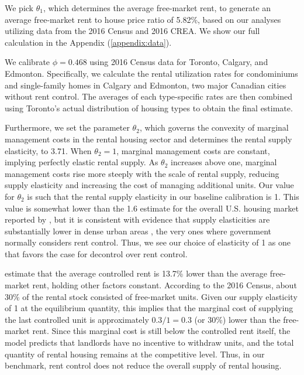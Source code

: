 \documentclass[parskip=full]{article}
\begin{document}
We pick $\theta_1$, which determines the average free-market rent, to generate an average free-market rent to house price ratio of 5.82\%, based on our analyses utilizing data from the 2016 Census and 2016 CREA. We show our full calculation in the Appendix (\ref{appendix:data}).

We calibrate $\phi=0.468$ using 2016 Census data for Toronto, Calgary, and Edmonton. Specifically, we calculate the rental utilization rates for condominiums and single-family homes in Calgary and Edmonton, two major Canadian cities without rent control. The averages of each type-specific rates are then combined using Toronto’s actual distribution of housing types to obtain the final estimate. 

Furthermore, we set the parameter $\theta_2$, which governs the convexity of marginal management costs in the rental housing sector and determines the rental supply elasticity, to 3.71. When $\theta_2=1$, marginal management costs are constant, implying perfectly elastic rental supply. As $\theta_2$ increases above one, marginal management costs rise more steeply with the scale of rental supply, reducing supply elasticity and increasing the cost of managing additional units. Our value for $\theta_2$ is such that the rental supply elasticity in our baseline calibration is 1. This value is somewhat lower than the 1.6 estimate for the overall U.S. housing market reported by \citet{rs-2023}, but it is consistent with evidence that supply elasticities are substantially lower in dense urban areas \citep{cy-1994,susin-2002,fack-2006,sy-2020}, the very ones where government normally considers rent control. Thus, we see our choice of elasticity of 1 as one that favors the case for decontrol over rent control.

\citet{zhang-gou} estimate that the average controlled rent is 13.7\% lower than the average free-market rent, holding other factors constant. According to the 2016 Census, about 30\% of the rental stock consisted of free-market units. Given our supply elasticity of 1 at the equilibrium quantity, this implies that the marginal cost of supplying the last controlled unit is approximately $0.3/1=0.3$ (or 30\%) lower than the free-market rent. Since this marginal cost is still below the controlled rent itself, the model predicts that landlords have no incentive to withdraw units, and the total quantity of rental housing remains at the competitive level. Thus, in our benchmark, rent control does not reduce the overall supply of rental housing.
\end{document}

